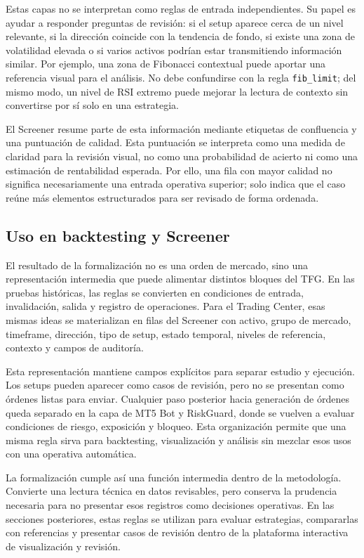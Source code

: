 Estas capas no se interpretan como reglas de entrada independientes. Su papel
es ayudar a responder preguntas de revisi\'on: si el setup aparece cerca de un
nivel relevante, si la direcci\'on coincide con la tendencia de fondo, si existe
una zona de volatilidad elevada o si varios activos podr\'ian estar transmitiendo
informaci\'on similar. Por ejemplo, una zona de Fibonacci contextual puede
aportar una referencia visual para el an\'alisis. No debe confundirse con la
regla \texttt{fib\_limit}; del mismo modo, un nivel de RSI extremo puede
mejorar la lectura de contexto sin convertirse por s\'i solo en una estrategia.

El Screener resume parte de esta informaci\'on mediante etiquetas de confluencia
y una puntuaci\'on de calidad. Esta puntuaci\'on se interpreta como una medida de
claridad para la revisi\'on visual, no como una probabilidad de acierto ni como
una estimaci\'on de rentabilidad esperada. Por ello, una fila con mayor calidad no
significa necesariamente una entrada operativa superior; solo indica que el
caso re\'une m\'as elementos estructurados para ser revisado de forma ordenada.

\subsection{Uso en backtesting y Screener}
\label{subsec:salida-formalizacion-screener}

El resultado de la formalizaci\'on no es una orden de mercado, sino una
representaci\'on intermedia que puede alimentar distintos bloques del TFG. En las pruebas
hist\'oricas, las reglas se convierten en condiciones de entrada, invalidaci\'on,
salida y registro de operaciones. Para el Trading Center, esas mismas ideas se
materializan en filas del Screener con activo, grupo de mercado, timeframe,
direcci\'on, tipo de setup, estado temporal, niveles de referencia, contexto y
campos de auditor\'ia.

Esta representaci\'on mantiene campos expl\'icitos para separar estudio y ejecuci\'on. Los
setups pueden aparecer como casos de revisi\'on, pero no se presentan como
\'ordenes listas para enviar. Cualquier paso posterior hacia generaci\'on de
\'ordenes queda separado en la capa de MT5 Bot y RiskGuard, donde se vuelven a
evaluar condiciones de riesgo, exposici\'on y bloqueo. Esta organizaci\'on
permite que una misma regla sirva para backtesting, visualizaci\'on y an\'alisis
sin mezclar esos usos con una operativa autom\'atica.

La formalizaci\'on cumple as\'i una funci\'on intermedia dentro de la metodolog\'ia.
Convierte una lectura t\'ecnica en datos revisables, pero conserva la prudencia
necesaria para no presentar esos registros como decisiones operativas. En las
secciones posteriores, estas reglas se utilizan para evaluar estrategias,
compararlas con referencias y presentar casos de revisi\'on dentro de la
plataforma interactiva de visualizaci\'on y revisi\'on.

